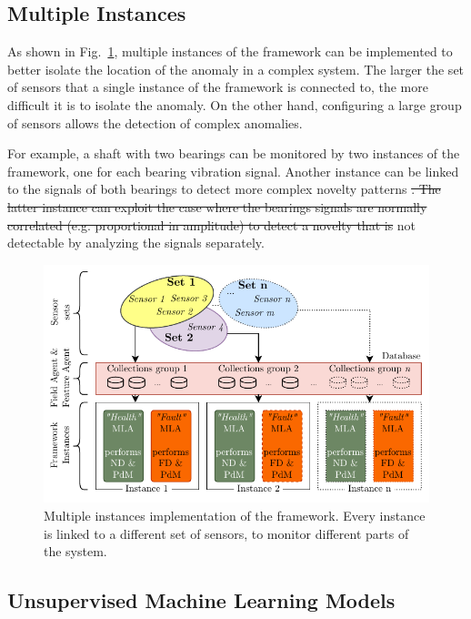 \documentclass[a4paper, 10pt, conference, oneside]{ieeeconf}
\providecommand{\DIFaddtex}[1]{{\protect\color{blue}\uwave{#1}}} %
\providecommand{\DIFdeltex}[1]{{\protect\color{red}\sout{#1}}}                      %
\providecommand{\DIFaddbegin}{} %
\providecommand{\DIFaddend}{} %
\providecommand{\DIFdelbegin}{} %
\providecommand{\DIFdelend}{} %
\providecommand{\DIFadd}[1]{\texorpdfstring{\DIFaddtex{#1}}{#1}} %
\providecommand{\DIFdel}[1]{\texorpdfstring{\DIFdeltex{#1}}{}} %
\newcommand{\DIFscaledelfig}{0.5}
\newlength{\DIFdelgraphicswidth} %
\newlength{\DIFdelgraphicsheight} %
\newcommand{\DIFaddincludegraphics}[2][]{{\color{blue}\fbox{\DIFOincludegraphics[#1]{#2}}}} %
\newcommand{\DIFdelincludegraphics}[2][]{%
\sbox{\DIFdelgraphicsbox}{\DIFOincludegraphics[#1]{#2}}%
\settoboxwidth{\DIFdelgraphicswidth}{\DIFdelgraphicsbox} %
\settoboxtotalheight{\DIFdelgraphicsheight}{\DIFdelgraphicsbox} %
\scalebox{\DIFscaledelfig}{%
\parbox[b]{\DIFdelgraphicswidth}{\usebox{\DIFdelgraphicsbox}\\[-\baselineskip] \rule{\DIFdelgraphicswidth}{0em}}\llap{\resizebox{\DIFdelgraphicswidth}{\DIFdelgraphicsheight}{%
\setlength{\unitlength}{\DIFdelgraphicswidth}%
\begin{picture}(1,1)%
\thicklines\linethickness{2pt} %
{\color[rgb]{1,0,0}\put(0,0){\framebox(1,1){}}}%
{\color[rgb]{1,0,0}\put(0,0){\line( 1,1){1}}}%
{\color[rgb]{1,0,0}\put(0,1){\line(1,-1){1}}}%
\end{picture}%
}\hspace*{3pt}}} %
} %
\DeclareRobustCommand{\DIFaddbegin}{\DIFOaddbegin \let\includegraphics\DIFaddincludegraphics} %
\DeclareRobustCommand{\DIFaddend}{\DIFOaddend \let\includegraphics\DIFOincludegraphics} %
\DeclareRobustCommand{\DIFdelbegin}{\DIFOdelbegin \let\includegraphics\DIFdelincludegraphics} %
\DeclareRobustCommand{\DIFdelend}{\DIFOaddend \let\includegraphics\DIFOincludegraphics} %
\begin{document}
\subsection{Multiple Instances}
As shown in Fig.~\ref{fig:multiple_instances}, multiple instances of the framework can be implemented to better isolate the location of the anomaly in a complex system. The larger the set of sensors that a single instance of the framework is connected to, the more difficult it is to isolate the anomaly. On the other hand, configuring a large group of sensors allows the detection of complex anomalies. 

For example, a shaft with two bearings can be monitored by two instances of the framework, one for each bearing vibration signal. Another instance can be linked to the signals of both bearings to detect more complex novelty patterns \DIFdelbegin \DIFdel{. The latter instance can exploit the case where the bearings signals are normally correlated (e.g. proportional in amplitude) to detect a novelty that is }\DIFdelend \DIFaddbegin \DIFadd{that are }\DIFaddend not detectable by analyzing the signals separately.   

\begin{figure}
    \includegraphics[width=\linewidth]{images/FrameworkInstances.pdf}
    \caption{Multiple instances implementation of the framework. Every instance is linked to a different set of sensors, to monitor different parts of the system.}
    \label{fig:multiple_instances}
\end{figure}


\subsection{Unsupervised Machine Learning Models}
\end{document}
